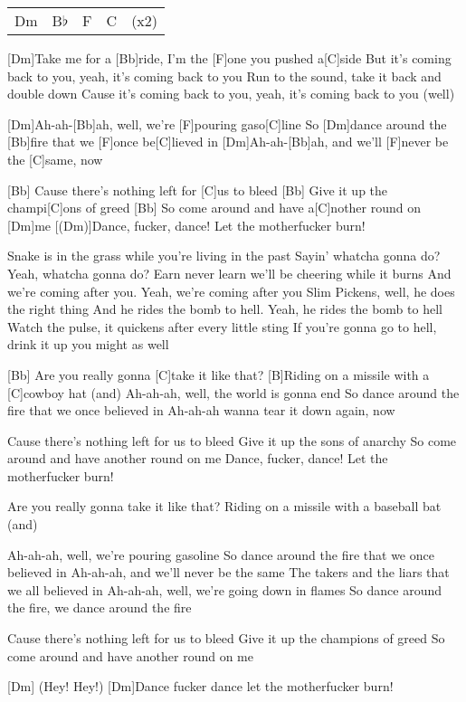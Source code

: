 

\begin{guitar}
	{\footnotesize\begin{tabular}{l|l|l|l l}
			Dm & B$\flat$ & F & C & (x2)
	\end{tabular}}
	
	[Dm]Take me for a [Bb]ride, I'm the [F]one you pushed a[C]side
	But it's coming back to you, yeah, it's coming back to you
	Run to the sound, take it back and double down
	Cause it's coming back to you, yeah, it's coming back to you (well)
	
	[Dm]Ah-ah-[Bb]ah, well, we're [F]pouring gaso[C]line
	So [Dm]dance around the [Bb]fire that we [F]once be[C]lieved in
	[Dm]Ah-ah-[Bb]ah, and we'll [F]never be the [C]same, now
	
	[Bb] Cause there's nothing left for [C]us to bleed
	[Bb] Give it up the champi[C]ons of greed
	[Bb] So come around and have a[C]nother round on [Dm]me
	[(Dm)]Dance, fucker, dance! Let the motherfucker burn!
	
	Snake is in the grass while you're living in the past
	Sayin' whatcha gonna do? Yeah, whatcha gonna do?
	Earn never learn we'll be cheering while it burns
	And we're coming after you. Yeah, we're coming after you
	Slim Pickens, well, he does the right thing
	And he rides the bomb to hell. Yeah, he rides the bomb to hell
	Watch the pulse, it quickens after every little sting
	If you're gonna go to hell, drink it up you might as well
	
	[Bb] Are you really gonna [C]take it like that?
	[B]Riding on a missile with a [C]cowboy hat (and)
	\pagebreak
	Ah-ah-ah, well, the world is gonna end
	So dance around the fire that we once believed in
	Ah-ah-ah wanna tear it down again, now
	
	Cause there's nothing left for us to bleed
	Give it up the sons of anarchy
	So come around and have another round on me
	Dance, fucker, dance! Let the motherfucker burn!
	
	
	Are you really gonna take it like that?
	Riding on a missile with a baseball bat (and)
	
	Ah-ah-ah, well, we're pouring gasoline
	So dance around the fire that we once believed in
	Ah-ah-ah, and we'll never be the same
	The takers and the liars that we all believed in
	Ah-ah-ah, well, we're going down in flames
	So dance around the fire, we dance around the fire
	
	Cause there's nothing left for us to bleed
	Give it up the champions of greed
	So come around and have another round on me
	
	[Dm] (Hey! Hey!)
	[Dm]Dance fucker dance let the motherfucker burn!
\end{guitar}